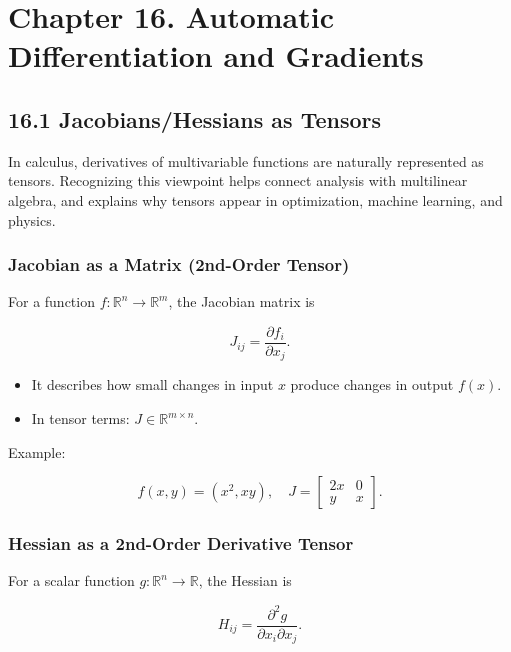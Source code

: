 \documentclass[
  letterpaper,
  DIV=11,
  numbers=noendperiod]{scrreprt}
\providecommand{\tightlist}{%
  \setlength{\itemsep}{0pt}\setlength{\parskip}{0pt}}
\begin{document}
\section{Chapter 16. Automatic Differentiation and
Gradients}\label{chapter-16.-automatic-differentiation-and-gradients}

\subsection{16.1 Jacobians/Hessians as
Tensors}\label{jacobianshessians-as-tensors}

In calculus, derivatives of multivariable functions are naturally
represented as tensors. Recognizing this viewpoint helps connect
analysis with multilinear algebra, and explains why tensors appear in
optimization, machine learning, and physics.

\subsubsection{Jacobian as a Matrix (2nd-Order
Tensor)}\label{jacobian-as-a-matrix-2nd-order-tensor}

For a function \(f: \mathbb{R}^n \to \mathbb{R}^m\), the Jacobian matrix
is

\[
J_{ij} = \frac{\partial f_i}{\partial x_j}.
\]

\begin{itemize}
\tightlist
\item
  It describes how small changes in input \(x\) produce changes in
  output \(f(x)\).
\item
  In tensor terms: \(J \in \mathbb{R}^{m \times n}\).
\end{itemize}

Example:

\[
f(x,y) = (x^2, xy), \quad J = \begin{bmatrix} 2x & 0 \\ y & x \end{bmatrix}.
\]

\subsubsection{Hessian as a 2nd-Order Derivative
Tensor}\label{hessian-as-a-2nd-order-derivative-tensor}

For a scalar function \(g: \mathbb{R}^n \to \mathbb{R}\), the Hessian is

\[
H_{ij} = \frac{\partial^2 g}{\partial x_i \partial x_j}.
\]
\end{document}
